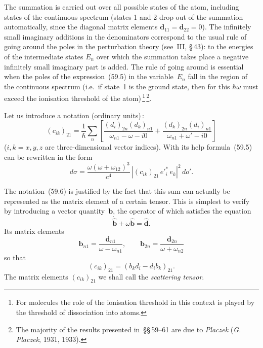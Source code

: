 The summation is carried out over all possible states of the atom, including states of the continuous spectrum (states 1 and 2 drop out of the summation automatically, since the diagonal matrix elements $\mathbf{d}_{11} = \mathbf{d}_{22} = 0$). The infinitely small imaginary additions in the denominators correspond to the usual rule of going around the poles in the perturbation theory (see~III, \S\,43): to the energies of the intermediate states $E_n$ over which the summation takes place a negative infinitely small imaginary part is added. The rule of going around is essential when the poles of the expression~(59.5) in the variable~$E_n$ fall in the region of the continuous spectrum (i.e.\ if state~1 is the ground state, then for this $\hbar\omega$ must exceed the ionisation threshold of the atom)\,\footnote{For molecules the role of the ionisation threshold in this context is played by the threshold of dissociation into atoms.}\,\footnote{The majority of the results presented in~\S\S\,59--61 are due to \textit{Placzek} (\textit{G.\,Placzek}, 1931, 1933).}.

Let us introduce a notation (ordinary units)\,\footnotemark[\value{footnote}]:
\begin{equation}
(c_{ik})_{21} = \frac{1}{\hbar}\sum_n\left[\frac{(d_i)_{2n}(d_k)_{n1}}{\omega_{n1} - \omega - i0} + \frac{(d_k)_{2n}(d_i)_{n1}}{\omega_{n1} + \omega' - i0}\right]
\tag{59.6}
\end{equation}
($i, k = x, y, z$ are three-dimensional vector indices). With its help formula~(59.5) can be rewritten in the form
\begin{equation}
d\sigma = \frac{\omega(\omega + \omega_{12})^3}{c^4}\,|(c_{ik})_{21}\,e'^*_i\,e_k|^2\,do'.
\tag{59.7}
\end{equation}

The notation~(59.6) is justified by the fact that this sum can actually be represented as the matrix element of a certain tensor. This is simplest to verify by introducing a vector quantity~$\mathbf{b}$, the operator of which satisfies the equation
\[
\dot{\hat{\mathbf{b}}} + \omega\hat{\mathbf{b}} = \hat{\mathbf{d}}.
\]
Its matrix elements
\[
\mathbf{b}_{n1} = \frac{\mathbf{d}_{n1}}{\omega - \omega_{n1}},\qquad \mathbf{b}_{2n} = \frac{\mathbf{d}_{2n}}{\omega + \omega_{n2}}
\]
so that
\begin{equation}
(c_{ik})_{21} = (b_k d_i - d_i b_k)_{21}.
\tag{59.8}
\end{equation}
The matrix elements $(c_{ik})_{21}$ we shall call the \textit{scattering tensor}.

